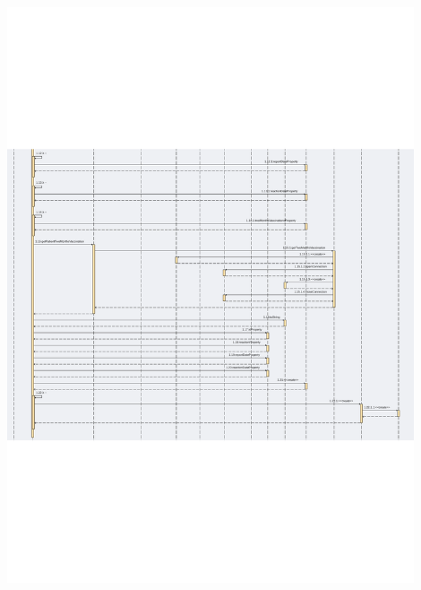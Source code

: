 \documentclass[11pt]{article}
\begin{document}
        \begin{center}
            \includegraphics[width=0.90\textwidth]{pictures/prova_002.png}
        \end{center}
    \newpage
\end{document}
